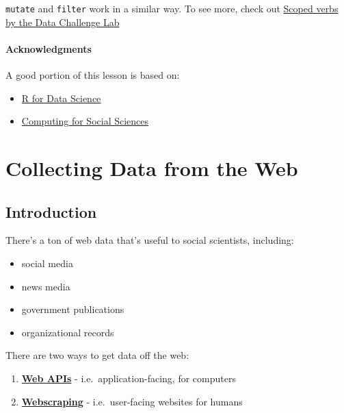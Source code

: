 \documentclass[]{book}
\providecommand{\tightlist}{%
  \setlength{\itemsep}{0pt}\setlength{\parskip}{0pt}}
\begin{document}
\texttt{mutate} and \texttt{filter} work in a similar way. To see more,
check out
\href{https://dcl-2017-04.github.io/curriculum/manip-scoped.html}{Scoped
verbs by the Data Challenge Lab}

\subsubsection*{Acknowledgments}\label{acknowledgments-5}

A good portion of this lesson is based on:

\begin{itemize}
\tightlist
\item
  \href{https://r4ds.had.co.nz/iteration.html}{R for Data Science}
\item
  \href{https://cfss.uchicago.edu/notes/iteration/}{Computing for Social
  Sciences}
\end{itemize}

\chapter{Collecting Data from the
Web}\label{collecting-data-from-the-web}

\section{Introduction}\label{introduction-2}

There's a ton of web data that's useful to social scientists, including:

\begin{itemize}
\tightlist
\item
  social media
\item
  news media
\item
  government publications
\item
  organizational records
\end{itemize}

There are two ways to get data off the web:

\begin{enumerate}
\def\labelenumi{\arabic{enumi}.}
\tightlist
\item
  \textbf{\protect\hyperlink{web-apis}{Web APIs}} -
  i.e.~application-facing, for computers
\item
  \textbf{\protect\hyperlink{webscraping}{Webscraping}} -
  i.e.~user-facing websites for humans
\end{enumerate}
\end{document}
